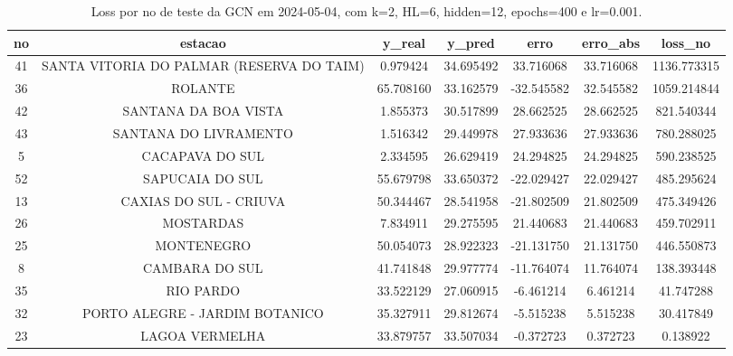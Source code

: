 \begin{table}[h]
\centering
\caption{Loss por no de teste da GCN em 2024-05-04, com k=2, HL=6, hidden=12, epochs=400 e lr=0.001.}
\label{tab:gcn_loss_k2_hl6_h12_e400_d20240504}
\begin{tabular}{ccccccc}
\toprule
no & estacao & y\_real & y\_pred & erro & erro\_abs & loss\_no \\
\midrule
41 & SANTA VITORIA DO PALMAR (RESERVA DO TAIM) & 0.979424 & 34.695492 & 33.716068 & 33.716068 & 1136.773315 \\
36 & ROLANTE & 65.708160 & 33.162579 & -32.545582 & 32.545582 & 1059.214844 \\
42 & SANTANA DA BOA VISTA & 1.855373 & 30.517899 & 28.662525 & 28.662525 & 821.540344 \\
43 & SANTANA DO LIVRAMENTO & 1.516342 & 29.449978 & 27.933636 & 27.933636 & 780.288025 \\
5 & CACAPAVA DO SUL & 2.334595 & 26.629419 & 24.294825 & 24.294825 & 590.238525 \\
52 & SAPUCAIA DO SUL & 55.679798 & 33.650372 & -22.029427 & 22.029427 & 485.295624 \\
13 & CAXIAS DO SUL - CRIUVA & 50.344467 & 28.541958 & -21.802509 & 21.802509 & 475.349426 \\
26 & MOSTARDAS & 7.834911 & 29.275595 & 21.440683 & 21.440683 & 459.702911 \\
25 & MONTENEGRO & 50.054073 & 28.922323 & -21.131750 & 21.131750 & 446.550873 \\
8 & CAMBARA DO SUL & 41.741848 & 29.977774 & -11.764074 & 11.764074 & 138.393448 \\
35 & RIO PARDO & 33.522129 & 27.060915 & -6.461214 & 6.461214 & 41.747288 \\
32 & PORTO ALEGRE - JARDIM BOTANICO & 35.327911 & 29.812674 & -5.515238 & 5.515238 & 30.417849 \\
23 & LAGOA VERMELHA & 33.879757 & 33.507034 & -0.372723 & 0.372723 & 0.138922 \\
\bottomrule
\end{tabular}
\end{table}
